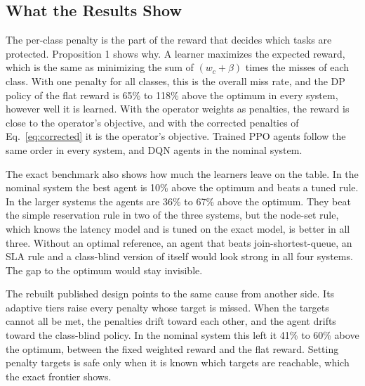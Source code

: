 \documentclass[journal]{IEEEtran}
\begin{document}
\subsection{What the Results Show}
The per-class penalty is the part of the reward that decides which tasks are protected. Proposition 1 shows why. A learner maximizes the expected reward, which is the same as minimizing the sum of $(w_c + \beta)$ times the misses of each class. With one penalty for all classes, this is the overall miss rate, and the DP policy of the flat reward is 65\% to 118\% above the optimum in every system, however well it is learned. With the operator weights as penalties, the reward is close to the operator's objective, and with the corrected penalties of Eq.~\eqref{eq:corrected} it is the operator's objective. Trained PPO agents follow the same order in every system, and DQN agents in the nominal system.

The exact benchmark also shows how much the learners leave on the table. In the nominal system the best agent is 10\% above the optimum and beats a tuned rule. In the larger systems the agents are 36\% to 67\% above the optimum. They beat the simple reservation rule in two of the three systems, but the node-set rule, which knows the latency model and is tuned on the exact model, is better in all three. Without an optimal reference, an agent that beats join-shortest-queue, an SLA rule and a class-blind version of itself would look strong in all four systems. The gap to the optimum would stay invisible.

The rebuilt published design points to the same cause from another side. Its adaptive tiers raise every penalty whose target is missed. When the targets cannot all be met, the penalties drift toward each other, and the agent drifts toward the class-blind policy. In the nominal system this left it 41\% to 60\% above the optimum, between the fixed weighted reward and the flat reward. Setting penalty targets is safe only when it is known which targets are reachable, which the exact frontier shows.
\end{document}
